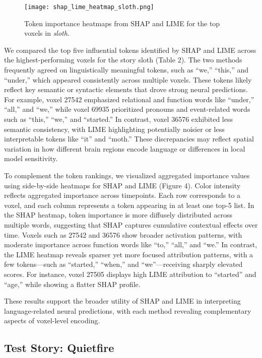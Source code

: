 \documentclass{article}
\begin{document}
\begin{figure}[h]
    \centering
    \texttt{[image: shap\_lime\_heatmap\_sloth.png]}
    \caption{Token importance heatmaps from SHAP and LIME for the top voxels in \textit{sloth}.}
    \label{fig:shap_lime_heatmap_sloth}
\end{figure}


We compared the top five influential tokens identified by SHAP and LIME across the highest-performing voxels for the story sloth (Table 2). The two methods frequently agreed on linguistically meaningful tokens, such as “we,” “this,” and “under,” which appeared consistently across multiple voxels. These tokens likely reflect key semantic or syntactic elements that drove strong neural predictions. For example, voxel 27542 emphasized relational and function words like “under,” “all,” and “we,” while voxel 69935 prioritized pronouns and event-related words such as “this,” “we,” and “started.” In contrast, voxel 36576 exhibited less semantic consistency, with LIME highlighting potentially noisier or less interpretable tokens like “it” and “moth.” These discrepancies may reflect spatial variation in how different brain regions encode language or differences in local model sensitivity.

To complement the token rankings, we visualized aggregated importance values using side-by-side heatmaps for SHAP and LIME (Figure 4). Color intensity reflects aggregated importance across timepoints. Each row corresponds to a voxel, and each column represents a token appearing in at least one top-5 list. In the SHAP heatmap, token importance is more diffusely distributed across multiple words, suggesting that SHAP captures cumulative contextual effects over time. Voxels such as 27542 and 36576 show broader activation patterns, with moderate importance across function words like “to,” “all,” and “we.” In contrast, the LIME heatmap reveals sparser yet more focused attribution patterns, with a few tokens—such as “started,” “when,” and “we”—receiving sharply elevated scores. For instance, voxel 27505 displays high LIME attribution to “started” and “age,” while showing a flatter SHAP profile.

These results support the broader utility of SHAP and LIME in interpreting language-related neural predictions, with each method revealing complementary aspects of voxel-level encoding.


\subsection{Test Story: Quietfire}
\end{document}
